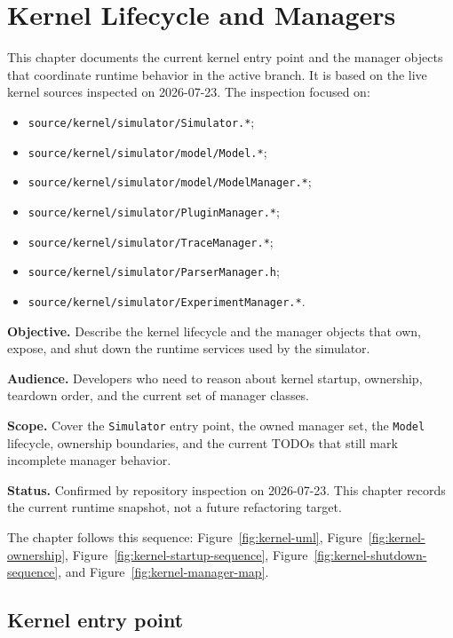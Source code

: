 \chapter{Kernel Lifecycle and Managers}
\label{chap:kernel-lifecycle-and-managers}

This chapter documents the current kernel entry point and the manager objects
that coordinate runtime behavior in the active branch. It is based on the live
kernel sources inspected on 2026-07-23. The inspection focused on:
\begin{itemize}
\item \texttt{source/kernel/simulator/Simulator.*};
\item \texttt{source/kernel/simulator/model/Model.*};
\item \texttt{source/kernel/simulator/model/ModelManager.*};
\item \texttt{source/kernel/simulator/PluginManager.*};
\item \texttt{source/kernel/simulator/TraceManager.*};
\item \texttt{source/kernel/simulator/ParserManager.h};
\item \texttt{source/kernel/simulator/ExperimentManager.*}.
\end{itemize}

\noindent\textbf{Objective.} Describe the kernel lifecycle and the manager
objects that own, expose, and shut down the runtime services used by the
simulator.

\noindent\textbf{Audience.} Developers who need to reason about kernel
startup, ownership, teardown order, and the current set of manager classes.

\noindent\textbf{Scope.} Cover the \texttt{Simulator} entry point, the owned
manager set, the \texttt{Model} lifecycle, ownership boundaries, and the
current TODOs that still mark incomplete manager behavior.

\noindent\textbf{Status.} Confirmed by repository inspection on 2026-07-23.
This chapter records the current runtime snapshot, not a future refactoring
target.

The chapter follows this sequence:
Figure~\ref{fig:kernel-uml},
Figure~\ref{fig:kernel-ownership},
Figure~\ref{fig:kernel-startup-sequence},
Figure~\ref{fig:kernel-shutdown-sequence}, and
Figure~\ref{fig:kernel-manager-map}.

\section{Kernel entry point}
\label{sec:kernel-entry-point}

